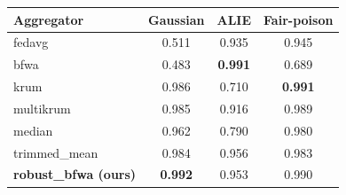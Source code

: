 \begin{tabular}{lccc}
\toprule
Aggregator & Gaussian & ALIE & Fair-poison \\
\midrule
fedavg & 0.511 & 0.935 & 0.945 \\
bfwa & 0.483 & \textbf{0.991} & 0.689 \\
krum & 0.986 & 0.710 & \textbf{0.991} \\
multikrum & 0.985 & 0.916 & 0.989 \\
median & 0.962 & 0.790 & 0.980 \\
trimmed\_mean & 0.984 & 0.956 & 0.983 \\
\textbf{robust\_bfwa (ours)} & \textbf{0.992} & 0.953 & 0.990 \\
\bottomrule
\end{tabular}